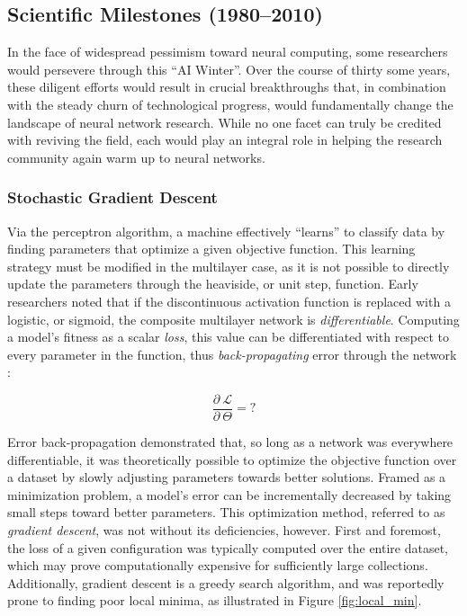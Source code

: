 \subsection{Scientific Milestones (1980--2010)}
\label{sec:advances}

In the face of widespread pessimism toward neural computing, some researchers would persevere through this ``AI Winter''.
Over the course of thirty some years, these diligent efforts would result in crucial breakthroughs that, in combination with the steady churn of technological progress, would fundamentally change the landscape of neural network research.
While no one facet can truly be credited with reviving the field, each would play an integral role in helping the research community again warm up to neural networks.

\subsubsection{Stochastic Gradient Descent}
\label{subsec:sgd}

Via the perceptron algorithm, a machine effectively ``learns'' to classify data by finding parameters that optimize a given objective function.
This learning strategy must be modified in the multilayer case, as it is not possible to directly update the parameters through the heaviside, or unit step, function.
Early researchers noted that if the discontinuous activation function is replaced with a logistic, or sigmoid, the composite multilayer network is \emph{differentiable}.
Computing a model's fitness as a scalar \emph{loss}, this value can be differentiated with respect to every parameter in the function, thus \emph{back-propagating} error through the network \cite{Hinton1986}:

\begin{equation}
\label{eq:xor}
\frac{\partial~\mathcal{L}}{\partial~\Theta}  = ?
\end{equation}


Error back-propagation demonstrated that, so long as a network was everywhere differentiable, it was theoretically possible to optimize the objective function over a dataset by slowly adjusting parameters towards better solutions.
Framed as a minimization problem, a model's error can be incrementally decreased by taking small steps toward better parameters.
This optimization method, referred to as \emph{gradient descent}, was not without its deficiencies, however.
First and foremost, the loss of a given configuration was typically computed over the entire dataset, which may prove computationally expensive for sufficiently large collections.
Additionally, gradient descent is a greedy search algorithm, and was reportedly prone to finding poor local minima, as illustrated in Figure \ref{fig:local_min}.

